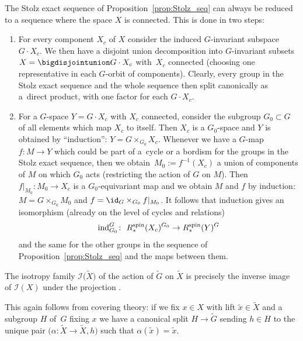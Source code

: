 	\begin{Remark}
		The Stolz exact sequence of Proposition~\ref{prop:Stolz_seq} can always be
		reduced to a sequence where the space $X$ is connected. This is done in two
		steps:
		\begin{enumerate}\itemsep=0pt
			\item[(1)] For every component $X_c$ of $X$ consider the induced $G$-invariant
			subspace $G\cdot X_c$. We then have a disjoint union decomposition into
			$G$-invariant subsets $X=\bigdisjointunion G\cdot X_c$ with~$X_c$ connected
			(choosing one representative in each $G$-orbit of components).
			Clearly, every group in the Stolz exact sequence and the whole sequence
			then split canonically as a~direct product, with one factor for each
			$G\cdot X_c$.
			\item[(2)] For a $G$-space $Y=G\cdot X_c$ with $X_c$ connected, consider the
			subgroup $G_0\subset G$ of all elements which map $X_c$ to itself. Then
			$X_c$ is a $G_0$-space and $Y$ is obtained by ``induction'': $Y=
			G\times_{G_0}X_c$. Whenever we have a $G$-map $f\colon M\to Y$ which
			could be part of a~cycle or a bordism for the groups in the Stolz exact
			sequence, then we obtain~${M_0:=f^{-1}(X_c)}$ a union of components of $M$
			on which $G_0$ acts (restricting the action of $G$ on $M$). Then~${f|_{M_0}\colon M_0\to X_c}$ is a $G_0$-equivariant map and we obtain $M$ and
			$f$ by induction: $M=G\times_{G_0} M_0$ and $f=\id_G\times_{G_0}
			f|_{M_0}$.
			It follows that induction gives an isomorphism (already on the level of
			cycles and relations)
			\begin{equation*}
				\mathrm{ind}_{G_0}^G\colon\ R^{\rm spin}_*(X_c)^{G_0}\to R^{\rm spin}_*(Y)^G
			\end{equation*}
			and the same for the other groups in the sequence of Proposition~\ref{prop:Stolz_seq}
			and the maps between them.
		\end{enumerate}
	\end{Remark}
	
	\begin{Remark}
		The isotropy family $\mathcal{I}\bigl(\tilde{X}\bigr)$ of the action of $\widetilde{G}$
		on $\tilde{X}$ is precisely the inverse image of $\mathcal{I}(X)$ under the projection
		\smash{$\widetilde{G}\to G$}.
		
		This again follows from covering theory: if we fix $x\in X$ with lift
		$\tilde x\in\tilde{X}$ and a subgroup $H$ of~$G$ fixing $x$ we have a
		canonical split $H\to \widetilde{G}$ sending $h\in H$ to the unique pair
		$\bigl(\alpha\colon \tilde X\to \tilde{X},h\bigr)$ such that $\alpha(\tilde x)=\tilde
		x$.
	\end{Remark}
	
